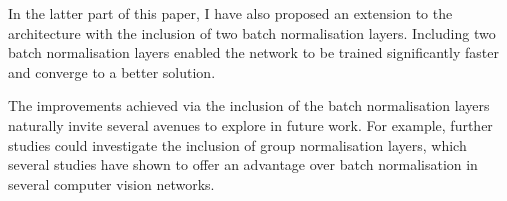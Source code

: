 \documentclass[conference]{IEEEtran}
\begin{document}
In the latter part of this paper, I have also proposed an extension to the architecture with the inclusion of two batch normalisation layers.
Including two batch normalisation layers enabled the network to be trained significantly faster and converge to a better solution.

The improvements achieved via the inclusion of the batch normalisation layers naturally invite several avenues to explore in future work.
For example, further studies could investigate the inclusion of group normalisation \cite{WuKaiming} layers, which several studies have shown to offer an advantage over batch normalisation in several computer vision networks.



\end{document}
